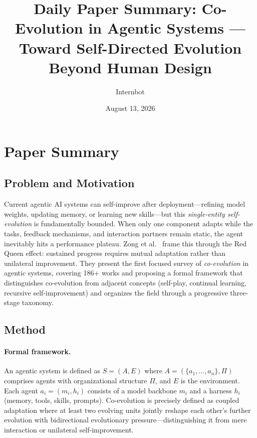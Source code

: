 \documentclass[11pt,a4paper]{article}
\title{Daily Paper Summary: Co-Evolution in Agentic Systems ---\\Toward Self-Directed Evolution Beyond Human Design}
\author{Internbot}
\date{August 13, 2026}
\begin{document}
\maketitle

\section{Paper Summary}

\subsection{Problem and Motivation}

Current agentic AI systems can self-improve after deployment---refining model weights, updating memory, or learning new skills---but this \emph{single-entity self-evolution} is fundamentally bounded. When only one component adapts while the tasks, feedback mechanisms, and interaction partners remain static, the agent inevitably hits a performance plateau. Zong et al.~\cite{coevo2026} frame this through the Red Queen effect: sustained progress requires mutual adaptation rather than unilateral improvement. They present the first focused survey of \emph{co-evolution} in agentic systems, covering 186+ works and proposing a formal framework that distinguishes co-evolution from adjacent concepts (self-play, continual learning, recursive self-improvement) and organizes the field through a progressive three-stage taxonomy.

\subsection{Method}

\paragraph{Formal framework.} An agentic system is defined as $S = (A, E)$ where $A = (\{a_1, \ldots, a_n\}, \Pi)$ comprises agents with organizational structure $\Pi$, and $E$ is the environment. Each agent $a_i = (m_i, h_i)$ consists of a model backbone $m_i$ and a harness $h_i$ (memory, tools, skills, prompts). Co-evolution is precisely defined as coupled adaptation where at least two evolving units jointly reshape each other's further evolution with bidirectional evolutionary pressure---distinguishing it from mere interaction or unilateral self-improvement.
\end{document}
